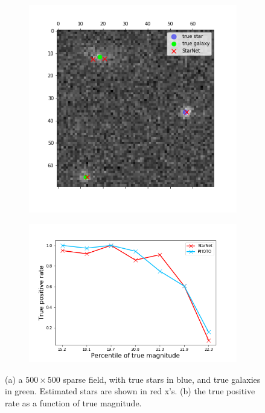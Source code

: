 \begin{figure}
    \centering
    \begin{subfigure}{0.45\textwidth}
        \includegraphics[width=\textwidth]{figures/sparse_field_detections.png}
        \subcaption{}
        \label{fig:sparse_field_detect}
    \end{subfigure}
    \begin{subfigure}{0.54\textwidth}
        \includegraphics[width=\textwidth]{figures/sparse_field_tpr.png}
        \subcaption{}
        \label{fig:sparse_field_tpr}
    \end{subfigure}
    \caption{(a) a $500\times 500$ sparse field, with true stars in 
    blue, and true galaxies in green. Estimated stars are shown in red x's. 
    (b) the true positive rate as a function of true magnitude. }
    \label{fig:sparse_field}
\end{figure}
